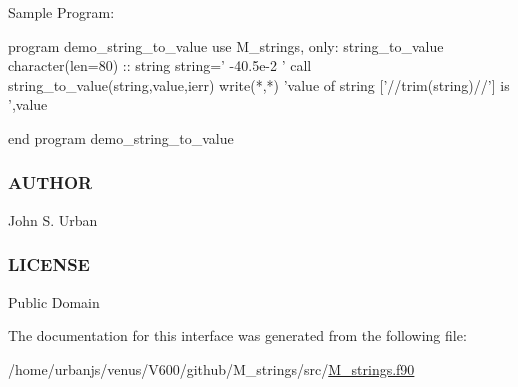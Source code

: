 Sample Program\+: \begin{DoxyVerb}program demo_string_to_value
use M_strings, only: string_to_value
character(len=80) :: string
   string=' -40.5e-2 '
   call string_to_value(string,value,ierr)
   write(*,*) 'value of string ['//trim(string)//'] is ',value
\end{DoxyVerb}
 end program demo\+\_\+string\+\_\+to\+\_\+value \subsubsection*{A\+U\+T\+H\+OR}

John S. Urban \subsubsection*{L\+I\+C\+E\+N\+SE}

Public Domain 

The documentation for this interface was generated from the following file\+:\begin{DoxyCompactItemize}
\item 
/home/urbanjs/venus/\+V600/github/\+M\+\_\+strings/src/\mbox{\hyperlink{M__strings_8f90}{M\+\_\+strings.\+f90}}\end{DoxyCompactItemize}
